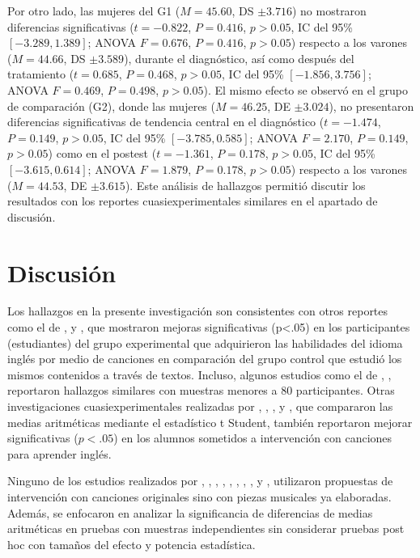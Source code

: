\documentclass[spanish]{textolivre}
\begin{document}
Por otro lado, las mujeres del G1 ($M=45.60$, DS $\pm 3.716$) no mostraron diferencias significativas ($t=-0.822$, $P=0.416$, $p>0.05$, IC del 95\% $[-3.289, 1.389]$; ANOVA $F=0.676$, $P=0.416$, $p>0.05$) respecto a los varones ($M=44.66$, DS $\pm 3.589$), durante el diagnóstico, así como después del tratamiento ($t=0.685$, $P=0.468$, $p>0.05$, IC del 95\% $[-1.856, 3.756]$; ANOVA $F=0.469$, $P=0.498$, $p>0.05$). El mismo efecto se observó en el grupo de comparación (G2), donde las mujeres ($M=46.25$, DE $\pm 3.024$), no presentaron diferencias significativas de tendencia central en el diagnóstico ($t=-1.474$, $P=0.149$, $p>0.05$, IC del 95\% $[-3.785, 0.585]$; ANOVA $F=2.170$, $P=0.149$, $p>0.05$) como en el postest ($t=-1.361$, $P=0.178$, $p>0.05$, IC del 95\% $[-3.615, 0.614]$; ANOVA $F=1.879$, $P=0.178$, $p>0.05$) respecto a los varones ($M=44.53$, DE $\pm 3.615$). Este análisis de hallazgos permitió discutir los resultados con los reportes cuasiexperimentales similares en el apartado de discusión.





\section{Discusión}

Los hallazgos en la presente investigación son consistentes con otros reportes como el de \textcite{forster2006value}, \textcite{ghanbari2014effects} y \textcite{saldiraner2021using}, que mostraron mejoras significativas (p<.05) en los participantes (estudiantes) del grupo experimental que adquirieron las habilidades del idioma inglés por medio de canciones en comparación del grupo control que estudió los mismos contenidos a través de textos. Incluso, algunos estudios como el de \textcite{ghanbari2014effects}, \textcite{saldiraner2021using}, reportaron hallazgos similares con muestras menores a 80 participantes. Otras investigaciones cuasiexperimentales realizadas por \textcite{moradi2014effect}, \textcite{shehadejiman2016effectiveness}, \textcite{yusmita2017effects}, \textcite{suwartono2019songs} y \textcite{jabak2021role}, que compararon las medias aritméticas mediante el estadístico t Student, también reportaron mejorar significativas ($p<.05$) en los alumnos sometidos a intervención con canciones para aprender inglés.

Ninguno de los estudios realizados por \textcite{komur2005teaching}, \textcite{forster2006value}, \textcite{ghanbari2014effects}, \textcite{moradi2014effect}, \textcite{malekian2016relationship}, \textcite{javadisafa2018effects}, \textcite{wahyuningsih2019kreasi}, \textcite{suwartono2019songs}, \textcite{jabak2021role} y \textcite{saldiraner2021using}, utilizaron propuestas de intervención con canciones originales sino con piezas musicales ya elaboradas. Además, se enfocaron en analizar la significancia de diferencias de medias aritméticas en pruebas con muestras independientes sin considerar pruebas post hoc con tamaños del efecto y potencia estadística.
\end{document}
